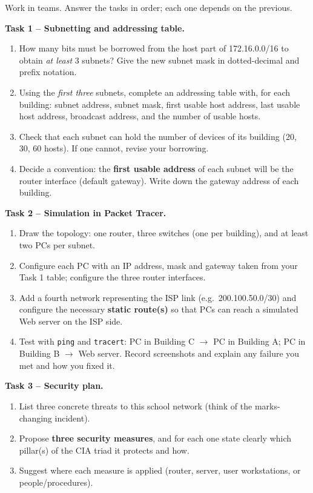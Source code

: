 \documentclass[11pt]{article}
\newcounter{popsec}
\newcounter{popsub}
\newcommand{\courssub}[1]{%
  \stepcounter{popsub}%
  \par\vspace{9pt}\noindent{\popxbold\fontsize{11.5}{13}\selectfont\color{popink}{\color{poporange}\thepopsec.\thepopsub}\hspace{6pt}#1}\par\nopagebreak\vspace{4pt}
}
\begin{document}
\courssub{Tasks}

Work in teams. Answer the tasks in order; each one depends on the previous.

\textbf{Task 1 -- Subnetting and addressing table.}
\begin{enumerate}
\item How many bits must be borrowed from the host part of 172.16.0.0/16 to obtain \emph{at least} 3 subnets? Give the new subnet mask in dotted-decimal and prefix notation.
\item Using the \emph{first three} subnets, complete an addressing table with, for each building: subnet address, subnet mask, first usable host address, last usable host address, broadcast address, and the number of usable hosts.
\item Check that each subnet can hold the number of devices of its building (20, 30, 60 hosts). If one cannot, revise your borrowing.
\item Decide a convention: the \textbf{first usable address} of each subnet will be the router interface (default gateway). Write down the gateway address of each building.
\end{enumerate}

\textbf{Task 2 -- Simulation in Packet Tracer.}
\begin{enumerate}
\item Draw the topology: one router, three switches (one per building), and at least two PCs per subnet.
\item Configure each PC with an IP address, mask and gateway taken from your Task 1 table; configure the three router interfaces.
\item Add a fourth network representing the ISP link (e.g.\ 200.100.50.0/30) and configure the necessary \textbf{static route(s)} so that PCs can reach a simulated Web server on the ISP side.
\item Test with \texttt{ping} and \texttt{tracert}: PC in Building C $\rightarrow$ PC in Building A; PC in Building B $\rightarrow$ Web server. Record screenshots and explain any failure you met and how you fixed it.
\end{enumerate}

\textbf{Task 3 -- Security plan.}
\begin{enumerate}
\item List three concrete threats to this school network (think of the marks-changing incident).
\item Propose \textbf{three security measures}, and for each one state clearly which pillar(s) of the CIA triad it protects and how.
\item Suggest where each measure is applied (router, server, user workstations, or people/procedures).
\end{enumerate}
\end{document}
